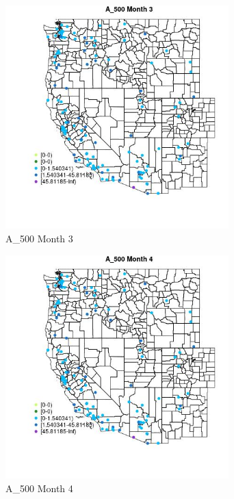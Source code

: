 \begin{figure} 
\centering  
\includegraphics[width=0.77\textwidth]{Code_Outputs/Report_ML_input_PM25_Step4_part_e_de_duplicated_aves_MapObsMo3A_500.jpg} 
\caption{\label{fig:Report_ML_input_PM25_Step4_part_e_de_duplicated_avesMapObsMo3A_500}A_500 Month 3} 
\end{figure} 
 

\begin{figure} 
\centering  
\includegraphics[width=0.77\textwidth]{Code_Outputs/Report_ML_input_PM25_Step4_part_e_de_duplicated_aves_MapObsMo4A_500.jpg} 
\caption{\label{fig:Report_ML_input_PM25_Step4_part_e_de_duplicated_avesMapObsMo4A_500}A_500 Month 4} 
\end{figure} 
 

